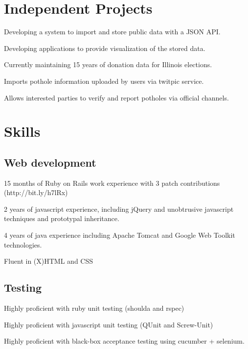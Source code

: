 \documentclass{resume}
\begin{document}
\section{Independent Projects}
\begin{compactitem}
  \item Developing a system to import and store public data with a JSON API.
  \item Developing applications to provide visualization of the stored data.
  \item Currently maintaining 15 years of donation data for Illinois elections.
\end{compactitem}

\begin{compactitem}
  \item Imports pothole information uploaded by users via twitpic service.
  \item Allows interested parties to verify and report potholes via official channels.
\end{compactitem}

\section{Skills}

\subsection{Web development}

\begin{compactitem}
  \item 15 months of Ruby on Rails work experience with 3 patch contributions (http://bit.ly/h7lRx)
  \item 2 years of javascript experience, including jQuery and unobtrusive javascript techniques and prototypal inheritance.
  \item 4 years of java experience including Apache Tomcat and Google Web Toolkit technologies.
  \item Fluent in (X)HTML and CSS
\end{compactitem}

\subsection{Testing}
\begin{compactitem}
  \item Highly proficient with ruby unit testing (shoulda and rspec)
  \item Highly proficient with javascript unit testing (QUnit and Screw-Unit)
  \item Highly proficient with black-box acceptance testing using cucumber + selenium.
\end{compactitem}
\end{document}
